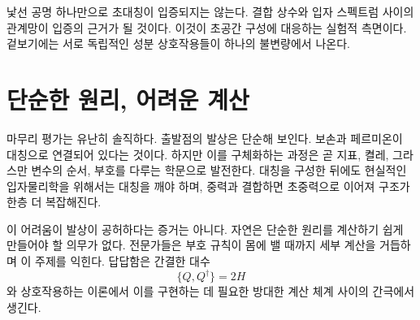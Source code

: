 낯선 공명 하나만으로 초대칭이 입증되지는 않는다. 결합 상수와 입자 스펙트럼 사이의 관계망이 입증의 근거가 될 것이다. 이것이 초공간 구성에 대응하는 실험적 측면이다. 겉보기에는 서로 독립적인 성분 상호작용들이 하나의 불변량에서 나온다.

\begin{classroomqa}
\end{classroomqa}

\section{단순한 원리, 어려운 계산}

마무리 평가는 유난히 솔직하다. 출발점의 발상은 단순해 보인다. 보손과 페르미온이 대칭으로 연결되어 있다는 것이다. 하지만 이를 구체화하는 과정은 곧 지표, 켤레, 그라스만 변수의 순서, 부호를 다루는 학문으로 발전한다. 대칭을 구성한 뒤에도 현실적인 입자물리학을 위해서는 대칭을 깨야 하며, 중력과 결합하면 초중력으로 이어져 구조가 한층 더 복잡해진다.

이 어려움이 발상이 공허하다는 증거는 아니다. 자연은 단순한 원리를 계산하기 쉽게 만들어야 할 의무가 없다. 전문가들은 부호 규칙이 몸에 밸 때까지 세부 계산을 거듭하며 이 주제를 익힌다. 답답함은 간결한 대수
\begin{equation}
\{Q,Q^\dagger\}=2H
\end{equation}
와 상호작용하는 이론에서 이를 구현하는 데 필요한 방대한 계산 체계 사이의 간극에서 생긴다.

\begin{classroomqa}
\end{classroomqa}

